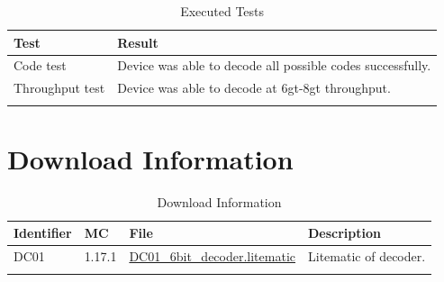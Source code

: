 \documentclass[10pt]{datasheet}
\begin{document}
\begin{table}[h]
\caption{Executed Tests}
\begin{tabularx}{\textwidth}{l | X}
    \thickhline
    \textbf{Test} & \textbf{Result} \\
    \hline
    Code test & Device was able to decode all possible codes successfully.\\
    \hline
    Throughput test & Device was able to decode at 6gt-8gt throughput.\\
    \thickhline
\end{tabularx}
\end{table}

\section{Download Information}
\begin{table}[h]
    \caption{Download Information}
    \begin{tabularx}{\textwidth}{l | l | l | X}
        \thickhline
        \textbf{Identifier} & \textbf{MC} & \textbf{File} & \textbf{Description} \\
        \hline
        DC01 & 1.17.1 & \href{https://github.com/Soontech-Annals/Archive/blob/364bde8dbcbc2e5337489ff435bcda9b387017e2/Archive/decoders/DC01\%206\%20Bit\%20Binary\%20Decoder/DC01\_6bit\_decoder.litematic?raw=1}{DC01\_6bit\_decoder.litematic} & Litematic of decoder. \\
        \thickhline
    \end{tabularx}
\end{table}
\end{document}
